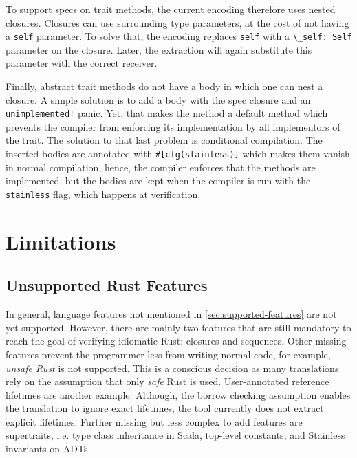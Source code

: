To support specs on trait methods, the current encoding therefore uses nested
closures. Closures can use surrounding type parameters, at the cost of not
having a \lstinline!self! parameter. To solve that, the encoding replaces
\lstinline!self! with a \passthrough{\lstinline!\_self: Self!} parameter on the
closure. Later, the extraction will again substitute this parameter with the
correct receiver.

Finally, abstract trait methods do not have a body in which one can nest a
closure. A simple solution is to add a body with the spec closure and an
\lstinline"unimplemented!" panic. Yet, that makes the method a default method
which prevents the compiler from enforcing its implementation by all
implementors of the trait. The solution to that last problem is conditional
compilation. The inserted bodies are annotated with
\lstinline!#[cfg(stainless)]! which makes them vanish in normal compilation,
hence, the compiler enforces that the methods are implemented, but the bodies
are kept when the compiler is run with the \lstinline!stainless! flag, which
happens at verification.



\section{Limitations}
\label{impl-limitations}

\subsection{Unsupported Rust Features}

In general, language features not mentioned in \autoref{sec:supported-features}
are not yet supported. However, there are mainly two features that are still
mandatory to reach the goal of verifying idiomatic Rust: closures and sequences.
Other missing features prevent the programmer less from writing normal code, for
example, \emph{unsafe Rust} is not supported. This is a conscious decision as
many translations rely on the assumption that only \emph{safe} Rust is used.
User-annotated reference lifetimes are another example. Although, the borrow
checking assumption enables the translation to ignore exact lifetimes, the tool
currently does not extract explicit lifetimes. Further missing but less complex
to add features are supertraits, i.e. type class inheritance in Scala, top-level
constants, and Stainless invariants on ADTs.

